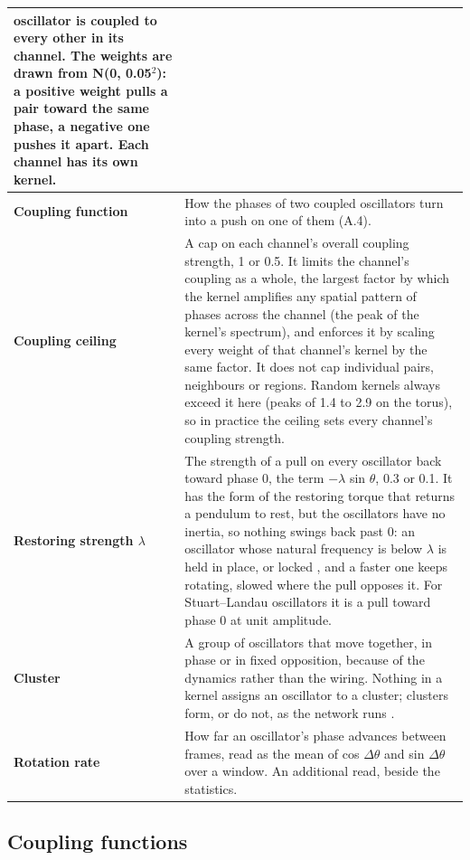\documentclass[10pt]{article}
\begin{document}
{\begin{longtable}[]{@{}
  >{\raggedright\arraybackslash}p{}
  >{\raggedright\arraybackslash}p{}@{}}
oscillator is coupled to every other in its channel. The weights are
drawn from N(0, 0.05\ensuremath{^{2}}): a positive weight pulls a pair
toward the same phase, a negative one pushes it apart. Each channel has
its own kernel. \\
\cmidrule{1-2}\textbf{Coupling function} & How the phases of two coupled
oscillators turn into a push on one of them (A.4). \\
\cmidrule{1-2}\textbf{Coupling ceiling} & A cap on each channel's
overall coupling strength, 1 or 0.5. It limits the channel's coupling as
a whole, the largest factor by which the kernel amplifies any spatial
pattern of phases across the channel (the peak of the kernel's
spectrum), and enforces it by scaling every weight of that channel's
kernel by the same factor. It does not cap individual pairs, neighbours
or regions. Random kernels always exceed it here (peaks of 1.4 to 2.9 on
the torus), so in practice the ceiling sets every channel's coupling
strength. \\
\cmidrule{1-2}\textbf{Restoring strength \ensuremath{\lambda}} & The
strength of a pull on every oscillator back toward phase 0, the term
\ensuremath{-\lambda} sin \ensuremath{\theta}, 0.3 or 0.1. It has the
form of the restoring torque that returns a pendulum to rest, but the
oscillators have no inertia, so nothing swings back past 0: an
oscillator whose natural frequency is below \ensuremath{\lambda} is held
in place, or locked \citep{adler1946}, and a faster one keeps rotating,
slowed where the pull opposes it. For Stuart--Landau oscillators it is a
pull toward phase 0 at unit amplitude. \\
\cmidrule{1-2}\textbf{Cluster} & A group of oscillators that move
together, in phase or in fixed opposition, because of the dynamics
rather than the wiring. Nothing in a kernel assigns an oscillator to a
cluster; clusters form, or do not, as the network runs
\citep{pikovsky2001}. \\
\cmidrule{1-2}\textbf{Rotation rate} & How far an oscillator's phase
advances between frames, read as the mean of cos
\ensuremath{\Delta\theta} and sin \ensuremath{\Delta\theta} over a
window. An additional read, beside the statistics. \\
\end{longtable}
}

\subsection{Coupling functions}\label{coupling-functions}
\end{document}
